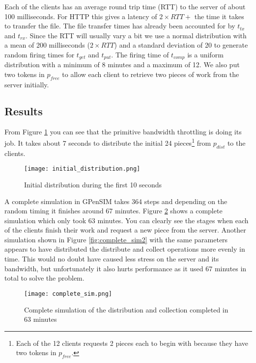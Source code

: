 Each of the clients has an average round trip time (RTT) to the server of about 100 milliseconds.
For HTTP this gives a latency of $2 \times RTT +$ the time it takes to transfer the file.
The file transfer times has already been accounted for by $t_{tx}$ and $t_{rx}$.
Since the RTT will usually vary a bit we use a normal distribution with a mean of 200 milliseconds ($2 \times RTT$) and a standard deviation of 20 to generate random firing times for $t_{get}$ and $t_{put}$.
The firing time of $t_{comp}$ is a uniform distribution with a minimum of 8 minutes and a maximum of 12.
We also put two tokens in $p_{free}$ to allow each client to retrieve two pieces of work from the server initially.


\subsection{Results}

From Figure \ref{fig:initdist} you can see that the primitive bandwidth throttling is doing its job.
It takes about 7 seconds to distribute the initial 24 pieces\footnote{Each of the 12 clients requests 2 pieces each to begin with because they have two tokens in $p_{free}$.} from $p_{dist}$ to the clients.

\begin{figure}[htbp]
	\centering 
	\texttt{[image: initial\_distribution.png]}
	\caption{Initial distribution during the first 10 seconds}
	\label{fig:initdist}
\end{figure}

A complete simulation in GPenSIM takes 364 steps and depending on the random timing it finishes around 67 minutes.
Figure \ref{fig:complete_sim} shows a complete simulation which only took 63 minutes.
You can clearly see the stages when each of the clients finish their work and request a new piece from the server.
Another simulation shown in Figure \ref{fig:complete_sim2} with the same parameters appears to have distributed the distribute and collect operations more evenly in time.
This would no doubt have caused less stress on the server and its bandwidth, but unfortunately it also hurts performance as it used 67 minutes in total to solve the problem.

\begin{figure}[htbp]
	\centering 
	\texttt{[image: complete\_sim.png]}
	\caption{Complete simulation of the distribution and collection completed in 63 minutes}
	\label{fig:complete_sim}
\end{figure}

